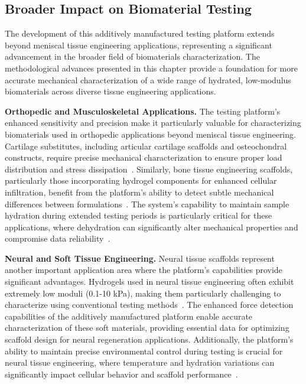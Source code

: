 \subsection{Broader Impact on Biomaterial Testing}

The development of this additively manufactured testing platform extends beyond meniscal tissue engineering applications, representing a significant advancement in the broader field of biomaterials characterization. The methodological advances presented in this chapter provide a foundation for more accurate mechanical characterization of a wide range of hydrated, low-modulus biomaterials across diverse tissue engineering applications.

\textbf{Orthopedic and Musculoskeletal Applications.} The testing platform's enhanced sensitivity and precision make it particularly valuable for characterizing biomaterials used in orthopedic applications beyond meniscal tissue engineering. Cartilage substitutes, including articular cartilage scaffolds and osteochondral constructs, require precise mechanical characterization to ensure proper load distribution and stress dissipation~\cite{patel2019systematicreview, chaudhuri2016hydrogelstunable, armiento2018biomaterialsarticular}. Similarly, bone tissue engineering scaffolds, particularly those incorporating hydrogel components for enhanced cellular infiltration, benefit from the platform's ability to detect subtle mechanical differences between formulations~\cite{bercea2024recent, nichol2010cellviability,ashwin20203dpolylactic,johannessen2005effectsdegeneration}. The system's capability to maintain sample hydration during extended testing periods is particularly critical for these applications, where dehydration can significantly alter mechanical properties and compromise data reliability~\cite{antoine2014review}.

\textbf{Neural and Soft Tissue Engineering.} Neural tissue scaffolds represent another important application area where the platform's capabilities provide significant advantages. Hydrogels used in neural tissue engineering often exhibit extremely low moduli (0.1-10 kPa), making them particularly challenging to characterize using conventional testing methods~\cite{rowley1999alginatehydrogels, nichol2010cellviability}. The enhanced force detection capabilities of the additively manufactured platform enable accurate characterization of these soft materials, providing essential data for optimizing scaffold design for neural regeneration applications. Additionally, the platform's ability to maintain precise environmental control during testing is crucial for neural tissue engineering, where temperature and hydration variations can significantly impact cellular behavior and scaffold performance~\cite{schinagl1996videomicroscopy}.

